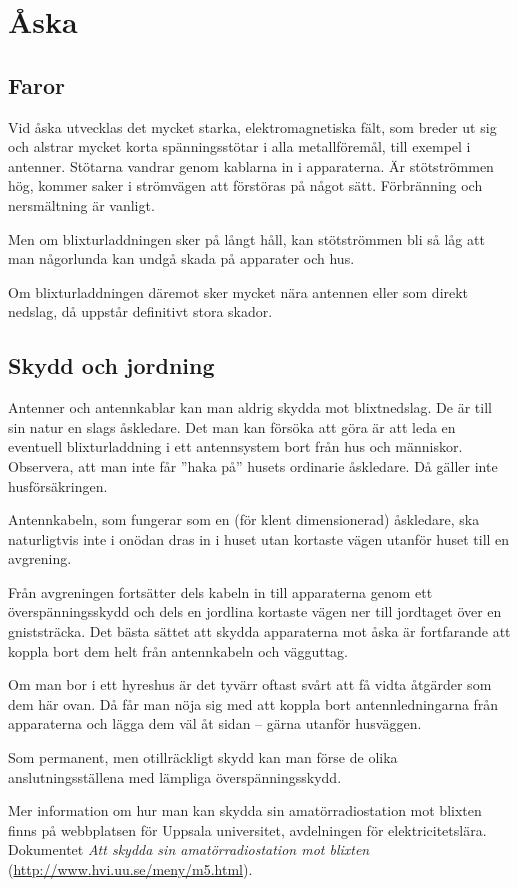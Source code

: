 \section{Åska}

\subsection{Faror}

Vid åska utvecklas det mycket starka, elektromagnetiska fält, som breder ut sig
och alstrar mycket korta spänningsstötar i alla metallföremål, till exempel i antenner.
Stötarna vandrar genom kablarna in i apparaterna.
Är stötströmmen hög, kommer saker i strömvägen att förstöras på något sätt.
Förbränning och nersmältning är vanligt.

Men om blixturladdningen sker på långt håll, kan stötströmmen bli så låg att
man någorlunda kan undgå skada på apparater och hus.

Om blixturladdningen däremot sker mycket nära antennen eller som direkt nedslag,
då uppstår definitivt stora skador.

\newpage %
\subsection{Skydd och jordning}

Antenner och antennkablar kan man aldrig skydda mot blixtnedslag.
De är till sin natur en slags åskledare.
Det man kan försöka att göra är att leda en eventuell blixturladdning i ett
antennsystem bort från hus och människor.
Observera, att man inte får ''haka på'' husets ordinarie åskledare.
Då gäller inte husförsäkringen.

Antennkabeln, som fungerar som en (för klent dimensionerad) åskledare,
ska naturligtvis inte i onödan dras in i huset utan kortaste vägen
utanför huset till en avgrening.

Från avgreningen fortsätter dels kabeln in till apparaterna genom ett
överspänningsskydd och dels en jordlina kortaste vägen ner till
jordtaget över en gniststräcka.
Det bästa sättet att skydda apparaterna mot åska är fortfarande att koppla bort
dem helt från antennkabeln och vägguttag.

Om man bor i ett hyreshus är det tyvärr oftast svårt att få vidta
åtgärder som dem här ovan.
Då får man nöja sig med att koppla bort antennledningarna från apparaterna och
lägga dem väl åt sidan -- gärna utanför husväggen.

Som permanent, men otillräckligt skydd kan man förse de olika
anslutningsställena med lämpliga överspänningsskydd.

Mer information om hur man kan skydda sin amatörradiostation mot blixten
finns på webbplatsen för Uppsala universitet, avdelningen för elektricitetslära.
Dokumentet \emph{Att skydda sin amatörradiostation mot blixten}
(\url{http://www.hvi.uu.se/meny/m5.html}).
